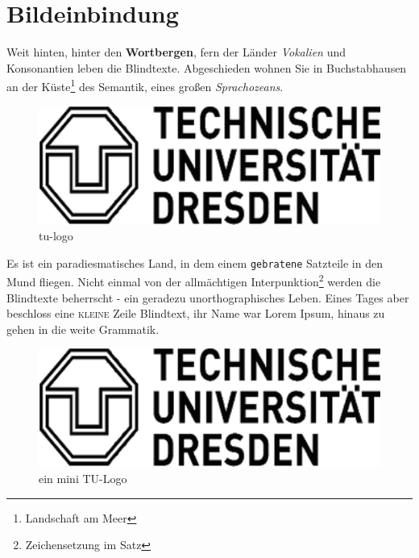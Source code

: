 \documentclass[%
	12pt,%
	a4paper,%
	oneside,%
	listof=totoc,
 	index=totoc,
	bibliography = totoc,
	parskip = half,%
	chapterprefix=false,%
	appendixprefix, %
	headings=small,%
]{scrreprt}
\begin{document}
\chapter{Bildeinbindung}
\label{sec:Bilder}

Weit hinten, hinter den \textbf{Wortbergen}, fern der Länder \textit{Vokalien} und Konsonantien leben die Blindtexte. Abgeschieden wohnen Sie in Buchstabhausen an der Küste\footnote{Landschaft am Meer}
des Semantik, eines großen \textsl{Sprachozeans}. %

\begin{figure}[htbp]
		\centering
		\includegraphics[scale=0.50]{images/tu_logo}%
	\caption{tu-logo}%
	\label{fig:tulogo}
\end{figure}

Es ist ein paradiesmatisches Land, in dem einem \texttt{gebratene} Satzteile in den Mund fliegen. Nicht einmal von der allmächtigen Interpunktion\footnote{Zeichensetzung im Satz} werden die Blindtexte beherrscht - ein geradezu unorthographisches Leben. Eines Tages aber beschloss eine \textsc{kleine} Zeile Blindtext, ihr Name war Lorem Ipsum, hinaus zu gehen in die weite Grammatik.

\begin{figure}[htbp]
		\centering
		\includegraphics[scale=0.10]{images/tu_logo}%
	\caption[kurz]{ein mini TU-Logo}%
	\label{fig:minitulogo}
\end{figure}
\end{document}
